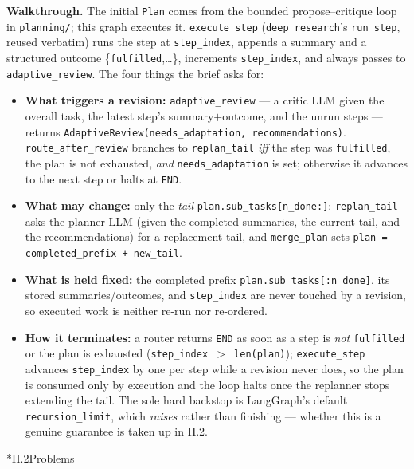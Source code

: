 \documentclass[11pt]{article}
\makeatletter
\newcommand{\code}[1]{\texttt{#1}}
\let\origsec\section
\renewcommand{\section}{\@ifstar{\tx@sec}{\origsec}}
\newcommand{\tx@sec}[1]{\phantomsection\origsec*{#1}\addcontentsline{toc}{subsection}{#1}}
\makeatother
\begin{document}
\noindent\textbf{Walkthrough.} The initial \code{Plan} comes from the bounded propose--critique loop in \code{planning/}; this graph
executes it. \code{execute\_step} (\code{deep\_research}'s \code{run\_step}, reused verbatim) runs the step at \code{step\_index},
appends a summary and a structured outcome \{\code{fulfilled},\dots\}, increments \code{step\_index}, and always passes to
\code{adaptive\_review}. The four things the brief asks for:
\begin{itemize}[leftmargin=2.2em,label={},topsep=3pt,itemsep=4pt]
\item \textbf{What triggers a revision:} \code{adaptive\_review} --- a critic LLM given the overall task, the latest step's
summary$+$outcome, and the unrun steps --- returns \code{AdaptiveReview(needs\_adaptation, recommendations)}.
\code{route\_after\_review} branches to \code{replan\_tail} \emph{iff} the step was \code{fulfilled}, the plan is not exhausted,
\emph{and} \code{needs\_adaptation} is set; otherwise it advances to the next step or halts at \code{END}.
\item \textbf{What may change:} only the \emph{tail} \code{plan.sub\_tasks[n\_done:]}: \code{replan\_tail} asks the planner LLM (given the
completed summaries, the current tail, and the recommendations) for a replacement tail, and \code{merge\_plan} sets
\code{plan = completed\_prefix + new\_tail}.
\item \textbf{What is held fixed:} the completed prefix \code{plan.sub\_tasks[:n\_done]}, its stored summaries/outcomes, and
\code{step\_index} are never touched by a revision, so executed work is neither re-run nor re-ordered.
\item \textbf{How it terminates:} a router returns \code{END} as soon as a step is \emph{not} \code{fulfilled} or the plan is exhausted
(\code{step\_index $>$ len(plan)}); \code{execute\_step} advances \code{step\_index} by one per step while a revision never does, so
the plan is consumed only by execution and the loop halts once the replanner stops extending the tail. The sole hard backstop is
LangGraph's default \code{recursion\_limit}, which \emph{raises} rather than finishing --- whether this is a genuine guarantee is
taken up in II.2.
\end{itemize}

\section*{II.2\quad Problems}
\end{document}
